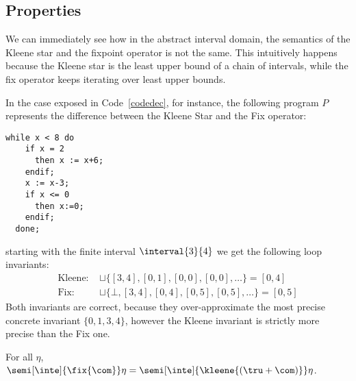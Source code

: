 \subsection{Properties}
\label{sub:intervalsprop}

We can immediately see how in the abstract interval domain, the
semantics of the Kleene star and the fixpoint operator is not the
same. This intuitively happens because the Kleene star is the least
upper bound of a chain of intervals, while the fix operator keeps
iterating over least upper bounds.

\begin{example} \label{ex:fix} In the case exposed in
  Code~\ref{codedec}, for instance, the following program \(P\)
  represents the difference between the Kleene Star and the Fix
  operator:
  \begin{lstlisting}[caption=\(\fix{\com}\) and \(\com^*\) difference, label=codedec, language=Imp]
  while x < 8 do
    if x = 2
      then x := x+6;
    endif;
    x := x-3;
    if x <= 0
      then x:=0;
    endif;
  done;\end{lstlisting}
  starting with the finite interval \(\interval{3}{4}\) we get the
  following loop invariants:
  \begin{align*}
    \text{Kleene: } &\sqcup\{[3,4], [0,1], [0,0], [0,0], \ldots\} = [0,4]\\
    \text{Fix: } & \sqcup\{\bot, [3,4], [0,4], [0,5], [0,5],\ldots\} = [0,5]
  \end{align*}
  \noindent
  Both invariants are correct, because they over-approximate the most
  precise concrete invariant \(\{0,1,3,4\}\), however the Kleene
  invariant is strictly more precise than the Fix one.
\end{example}

\begin{lemma}\label{le:sugar}
  For all \(\eta\),
  \(\semi[\inte]{\fix{\com}} \eta = \semi[\inte]{\kleene{(\tru + \com)}} \eta\).
\end{lemma}

